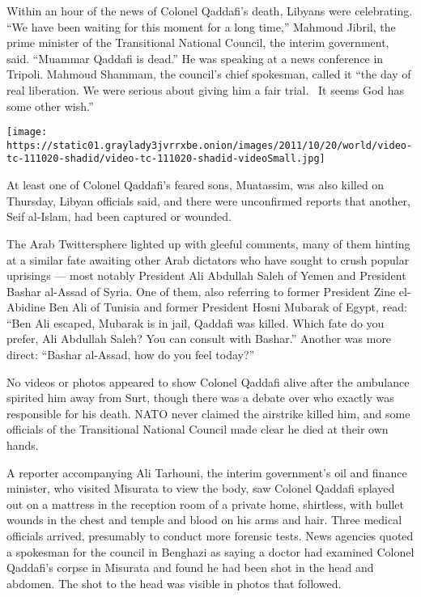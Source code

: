 Within an hour of the news of Colonel Qaddafi's death, Libyans were
celebrating. ``We have been waiting for this moment for a long time,''
Mahmoud Jibril, the prime minister of the Transitional National Council,
the interim government, said. ``Muammar Qaddafi is dead.'' He was
speaking at a news conference in Tripoli. Mahmoud Shammam, the council's
chief spokesman, called it ``the day of real liberation. We were serious
about giving him a fair trial. ~It seems God has some other wish.''

\texttt{[image: https://static01.graylady3jvrrxbe.onion/images/2011/10/20/world/video-tc-111020-shadid/video-tc-111020-shadid-videoSmall.jpg]}

At least one of Colonel Qaddafi's feared sons, Muatassim, was also
killed on Thursday, Libyan officials said, and there were unconfirmed
reports that another, Seif al-Islam, had been captured or wounded.

The Arab Twittersphere lighted up with gleeful comments, many of them
hinting at a similar fate awaiting other Arab dictators who have sought
to crush popular uprisings --- most notably President Ali Abdullah Saleh
of Yemen and President Bashar al-Assad of Syria. One of them, also
referring to former President Zine el-Abidine Ben Ali of Tunisia and
former President Hosni Mubarak of Egypt, read: ``Ben Ali escaped,
Mubarak is in jail, Qaddafi was killed. Which fate do you prefer, Ali
Abdullah Saleh? You can consult with Bashar.'' Another was more direct:
``Bashar al-Assad, how do you feel today?''

No videos or photos appeared to show Colonel Qaddafi alive after the
ambulance spirited him away from Surt, though there was a debate over
who exactly was responsible for his death. NATO never claimed the
airstrike killed him, and some officials of the Transitional National
Council made clear he died at their own hands.

A reporter accompanying Ali Tarhouni, the interim government's oil and
finance minister, who visited Misurata to view the body, saw Colonel
Qaddafi splayed out on a mattress in the reception room of a private
home, shirtless, with bullet wounds in the chest and temple and blood on
his arms and hair. Three medical officials arrived, presumably to
conduct more forensic tests. News agencies quoted a spokesman for the
council in Benghazi as saying a doctor had examined Colonel Qaddafi's
corpse in Misurata and found he had been shot in the head and abdomen.
The shot to the head was visible in photos that followed.


